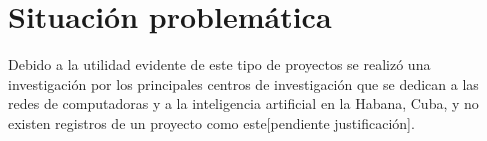 \section*{Situación problemática}
Debido a la utilidad evidente de este tipo de proyectos se realizó una investigación por los principales centros de investigación que se dedican a las redes de computadoras y a la inteligencia artificial en la Habana, Cuba, y no existen registros de un proyecto como este[pendiente justificación]. 





